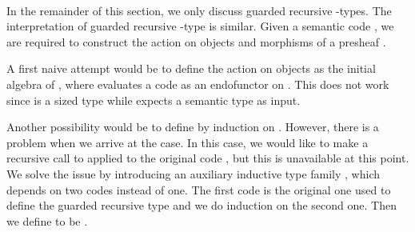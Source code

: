 {\begin{code}
\AgdaSpace{}%
\AgdaSymbol{(}\AgdaSpace{}%
\AgdaSpace{}%
\AgdaSymbol{)}\<%
\\
%
\>[2]\AgdaSpace{}%
\AgdaSymbol{:}\AgdaSpace{}%
\AgdaSymbol{\{}\AgdaSpace{}%
\AgdaSpace{}%
\AgdaSymbol{:}\AgdaSpace{}%
\AgdaSpace{}%
\AgdaSymbol{\}}\AgdaSpace{}%
\AgdaSpace{}%
\AgdaSpace{}%
\AgdaSpace{}%
\AgdaSpace{}%
\AgdaSpace{}%
\AgdaSpace{}%
\AgdaSpace{}%
\AgdaSymbol{(}\AgdaSpace{}%
\AgdaSpace{}%
\AgdaSymbol{)}\<%
\end{code}
}


In the remainder of this section, we only discuss guarded recursive -types. %
The interpretation of guarded recursive -type is similar.
Given a semantic code , we are required to construct the action on objects and morphisms of a presheaf  .

A first naive attempt would be to define the action on objects
  as the initial algebra of  , where
 evaluates a code as an endofunctor on 
. This does not work since   is a sized type
while   expects a semantic type as input.

Another possibility would be to define   by induction on .
However, there is a problem when we arrive at the  case.
In this case, we would like to make a recursive call to  applied to the original code , but this is unavailable at this point.
We solve the issue by introducing an auxiliary inductive type family , which depends on two codes instead of one.
The first code is the original one used to define the guarded recursive type and we do induction on the second one.
Then we define   to be   .


